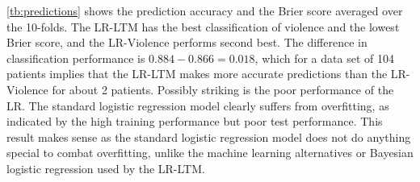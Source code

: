 \documentclass[a4paper,11pt]{article}
\begin{document}
\autoref{tb:predictions} shows the prediction accuracy and the Brier score averaged over the 10-folds.
The LR-LTM has the best classification of violence and the lowest Brier score, and the LR-Violence performs second best.
The difference in classification performance is $0.884 - 0.866 = 0.018$, which for a data set of 104 patients implies that the LR-LTM makes more accurate predictions than the LR-Violence for about 2 patients.
Possibly striking is the poor performance of the LR.
The standard logistic regression model clearly suffers from overfitting, as indicated by the high training performance but poor test performance. This result makes sense as the standard logistic regression model does not do anything special to combat overfitting, unlike the machine learning alternatives or Bayesian logistic regression used by the LR-LTM.
\end{document}
